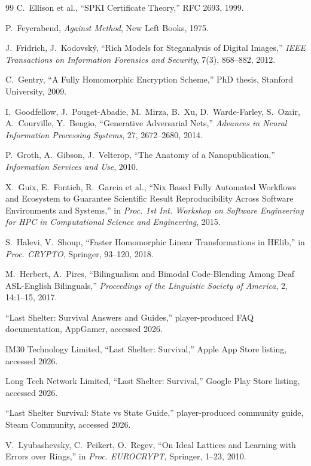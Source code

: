 \begin{thebibliography}{99}
C.~Ellison et al., ``SPKI Certificate Theory,'' RFC 2693, 1999.

P.~Feyerabend, \textit{Against Method}, New Left Books, 1975.

J.~Fridrich, J.~Kodovský, ``Rich Models for Steganalysis of Digital Images,'' \textit{IEEE Transactions on Information Forensics and Security}, 7(3), 868--882, 2012.

C.~Gentry, ``A Fully Homomorphic Encryption Scheme,'' PhD thesis, Stanford University, 2009.

I.~Goodfellow, J.~Pouget-Abadie, M.~Mirza, B.~Xu, D.~Warde-Farley, S.~Ozair, A.~Courville, Y.~Bengio, ``Generative Adversarial Nets,'' \textit{Advances in Neural Information Processing Systems}, 27, 2672--2680, 2014.

P.~Groth, A.~Gibson, J.~Velterop, ``The Anatomy of a Nanopublication,'' \textit{Information Services and Use}, 2010.

X.~Guix, E.~Fontich, R.~Garcia et al., ``Nix Based Fully Automated Workflows and Ecosystem to Guarantee Scientific Result Reproducibility Across Software Environments and Systems,'' in \textit{Proc. 1st Int. Workshop on Software Engineering for HPC in Computational Science and Engineering}, 2015.

S.~Halevi, V.~Shoup, ``Faster Homomorphic Linear Transformations in HElib,'' in \textit{Proc. CRYPTO}, Springer, 93--120, 2018.

M.~Herbert, A.~Pires, ``Bilingualism and Bimodal Code-Blending Among Deaf ASL-English Bilinguals,'' \textit{Proceedings of the Linguistic Society of America}, 2, 14:1--15, 2017.

``Last Shelter: Survival Answers and Guides,'' player-produced FAQ documentation, AppGamer, accessed 2026.

IM30 Technology Limited, ``Last Shelter: Survival,'' Apple App Store listing, accessed 2026.

Long Tech Network Limited, ``Last Shelter: Survival,'' Google Play Store listing, accessed 2026.

``Last Shelter Survival: State vs State Guide,'' player-produced community guide, Steam Community, accessed 2026.

V.~Lyubashevsky, C.~Peikert, O.~Regev, ``On Ideal Lattices and Learning with Errors over Rings,'' in \textit{Proc. EUROCRYPT}, Springer, 1--23, 2010.


\end{thebibliography}
